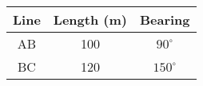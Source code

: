 \begin{center}
  \begin{tabular}{|c|c|c|}
    \hline
    \textbf{Line} & \textbf{Length (m)} & \textbf{Bearing} \\ \hline
    AB & 100 & $90^\circ$ \\ 
    BC & 120 & $150^\circ$ \\ \hline
  \end{tabular}
\end{center}
